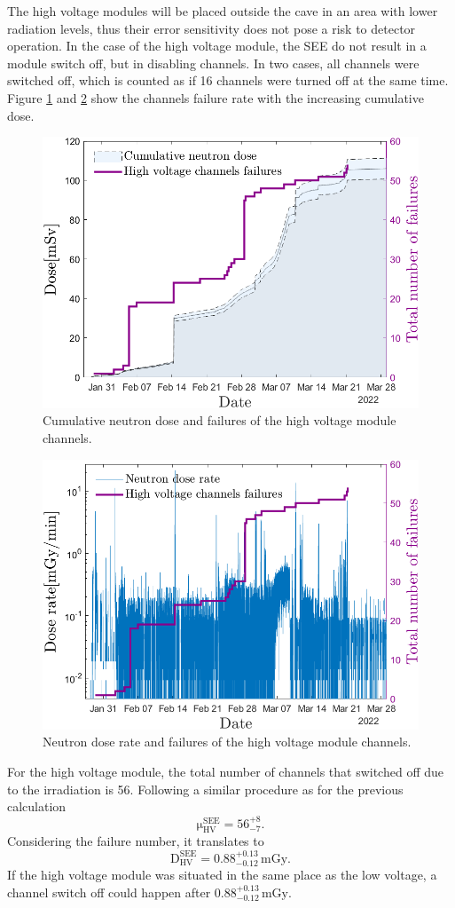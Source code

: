 The high voltage modules will be placed outside the cave in an area with lower radiation levels, thus their error sensitivity does not pose a risk to detector operation. In the case of the high voltage module, the \gls{SEE} do not result in a module switch off, but in disabling channels. In two cases, all channels were switched off, which is counted as if 16 channels were turned off at the same time. Figure \ref{fig:hv_neutrons} and \ref{fig:hv_neutrons_rate} show the channels failure rate with the increasing cumulative dose. 
\begin{figure}[!h]
    \centering
    \includegraphics[width=0.6\columnwidth]{Chapter4/images/HV_failure_and_neutronrate.png}
    \caption{Cumulative neutron dose and failures of the high voltage module channels.}
    \label{fig:hv_neutrons}
\end{figure}
\begin{figure}[!h]
    \centering
    \includegraphics[width=0.6\columnwidth]{Chapter4/images/Hv_neutrons_dose_rate.png}
    \caption{Neutron dose rate and failures of the high voltage module channels.}
    \label{fig:hv_neutrons_rate}
\end{figure}
For the high voltage module, the total number of channels that switched off due to the irradiation is 56. Following a similar procedure as for the previous calculation
  \begin{equation}
 \mathrm{\mu}_{\mathrm{HV}}^{\mathrm{SEE}}=\mathrm{56}_{-7}^{+8}.
\end{equation}
Considering the failure number, it translates to
\begin{equation}
    \mathrm{D}_{\mathrm{HV}}^{\mathrm{SEE}}=\mathrm{0.88}_{-0.12}^{+0.13}\mathrm{\,mGy}.
\end{equation}
If the high voltage module was situated in the same place as the low voltage, a channel switch off could happen after $\mathrm{0.88}_{-0.12}^{+0.13}\mathrm{\,mGy}$.

